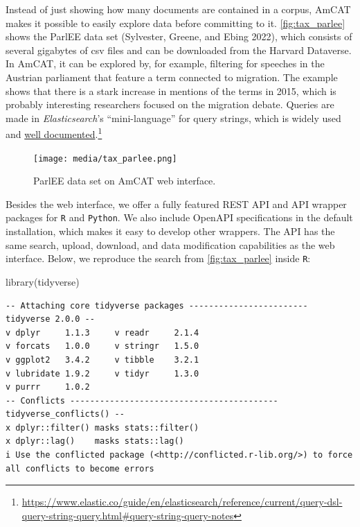 \documentclass[
  a4paper,
  DIV=11,
  numbers=noendperiod]{scrartcl}
\newenvironment{Shaded}{\begin{snugshade}}{\end{snugshade}}
\newcommand{\FunctionTok}[1]{\textcolor[rgb]{0.28,0.35,0.67}{#1}}
\newcommand{\NormalTok}[1]{\textcolor[rgb]{0.00,0.23,0.31}{#1}}
\begin{document}
Instead of just showing how many documents are contained in a corpus,
AmCAT makes it possible to easily explore data before committing to it.
\autoref{fig:tax_parlee} shows the ParlEE data set (Sylvester, Greene,
and Ebing 2022), which consists of several gigabytes of csv files and
can be downloaded from the Harvard Dataverse. In AmCAT, it can be
explored by, for example, filtering for speeches in the Austrian
parliament that feature a term connected to migration. The example shows
that there is a stark increase in mentions of the terms in 2015, which
is probably interesting researchers focused on the migration debate.
Queries are made in \emph{Elasticsearch}'s ``mini-language'' for query
strings, which is widely used and
\href{https://web.archive.org/web/20230827002715/https://www.elastic.co/guide/en/elasticsearch/reference/current/query-dsl-query-string-query.html}{well
documented}.\footnote{\url{https://www.elastic.co/guide/en/elasticsearch/reference/current/query-dsl-query-string-query.html\#query-string-query-notes}}

\begin{figure}

{\centering \texttt{[image: media/tax\_parlee.png]}

}

\caption{ParlEE data set on AmCAT web interface.\label{fig:tax_parlee}}

\end{figure}

Besides the web interface, we offer a fully featured REST API and API
wrapper packages for \texttt{R} and \texttt{Python}. We also include
OpenAPI specifications in the default installation, which makes it easy
to develop other wrappers. The API has the same search, upload,
download, and data modification capabilities as the web interface.
Below, we reproduce the search from \autoref{fig:tax_parlee} inside
\texttt{R}:

\begin{Shaded}
\begin{Highlighting}[]
\FunctionTok{library}\NormalTok{(tidyverse)}
\end{Highlighting}
\end{Shaded}

\begin{verbatim}
-- Attaching core tidyverse packages ------------------------ tidyverse 2.0.0 --
v dplyr     1.1.3     v readr     2.1.4
v forcats   1.0.0     v stringr   1.5.0
v ggplot2   3.4.2     v tibble    3.2.1
v lubridate 1.9.2     v tidyr     1.3.0
v purrr     1.0.2     
-- Conflicts ------------------------------------------ tidyverse_conflicts() --
x dplyr::filter() masks stats::filter()
x dplyr::lag()    masks stats::lag()
i Use the conflicted package (<http://conflicted.r-lib.org/>) to force all conflicts to become errors
\end{verbatim}
\end{document}
